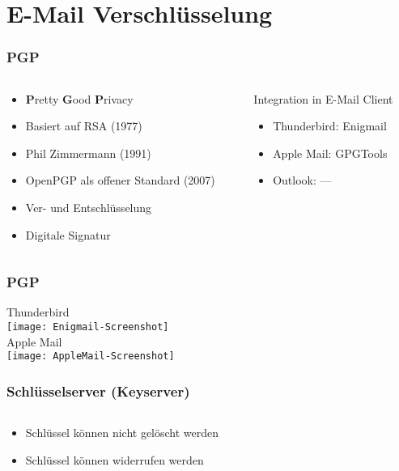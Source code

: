 \section{E-Mail Verschlüsselung}


\begin{frame}
  \frametitle{PGP}
  \begin{columns}[c]
    \begin{column}{0.5\textwidth}
      \begin{itemize}
	\item \textbf{P}retty \textbf{G}ood \textbf{P}rivacy
	\item Basiert auf RSA (1977)
        \item Phil Zimmermann (1991)
        \item OpenPGP als offener Standard (2007)
        \item Ver- und Entschlüsselung
        \item Digitale Signatur
      \end{itemize}
    \end{column}
    \begin{column}{0.5\textwidth}
          Integration in E-Mail Client
        \begin{itemize}
          \item Thunderbird: Enigmail
          \item Apple Mail: GPGTools
          \item Outlook: ---
        \end{itemize}
    \end{column}
  \end{columns}

\end{frame}

\begin{frame}
  \frametitle{PGP}
  \center
   Thunderbird\\[0.2em]
   \texttt{[image: Enigmail-Screenshot]}\\[0.7em]
   Apple Mail\\[0.2em]
   \texttt{[image: AppleMail-Screenshot]}
\end{frame}

\begin{frame}
  \frametitle{Schlüsselserver (Keyserver)}
  \begin{columns}[c]
    \begin{column}{0.5\textwidth}
      \begin{itemize}
       \item Schlüssel können nicht gelöscht werden
       \item Schlüssel können widerrufen werden
      \end{itemize}

    \end{column}
    \begin{column}{0.5\textwidth}
      \center {}
    \end{column}
  \end{columns}
\end{frame}

